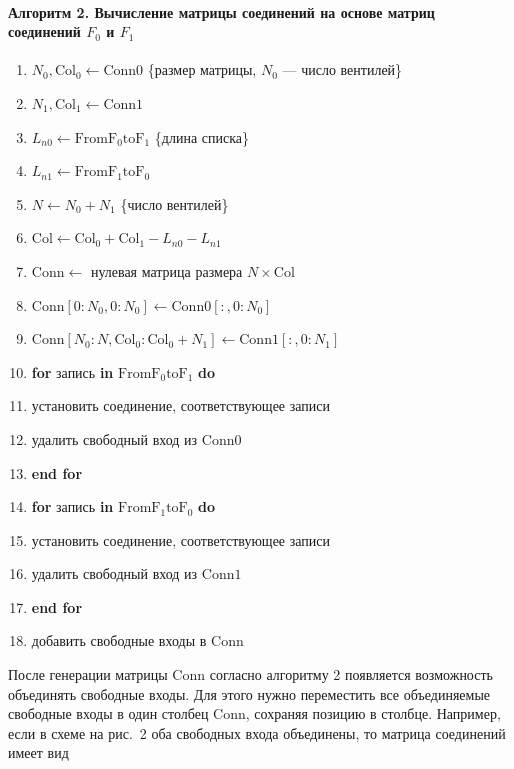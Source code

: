 \documentclass[a4paper,12pt]{article}
\begin{document}
\paragraph{Алгоритм 2. Вычисление матрицы соединений на основе матриц соединений \(F_0\) и \(F_1\)}
\begin{enumerate}
\item \(N_0, \mathrm{Col}_0 \leftarrow \mathrm{Conn0}\) \{размер матрицы, \(N_0\) --- число вентилей\}
\item \(N_1, \mathrm{Col}_1 \leftarrow \mathrm{Conn1}\)
\item \(L_{n0} \leftarrow \mathrm{FromF_0toF_1}\) \{длина списка\}
\item \(L_{n1} \leftarrow \mathrm{FromF_1toF_0}\)
\item \(N \leftarrow N_0 + N_1\) \{число вентилей\}
\item \(\mathrm{Col} \leftarrow \mathrm{Col}_0 + \mathrm{Col}_1 - L_{n0} - L_{n1}\)
\item \(\mathrm{Conn} \leftarrow\) нулевая матрица размера \(N \times \mathrm{Col}\)
\item \(\mathrm{Conn}[0:N_0, 0:N_0] \leftarrow \mathrm{Conn0}[:, 0:N_0]\)
\item \(\mathrm{Conn}[N_0:N, \mathrm{Col}_0:\mathrm{Col}_0 + N_1] \leftarrow \mathrm{Conn1}[:, 0:N_1]\)
\item \textbf{for} запись \textbf{in} \(\mathrm{FromF_0toF_1}\) \textbf{do}
\item \quad установить соединение, соответствующее записи
\item \quad удалить свободный вход из \(\mathrm{Conn0}\)
\item \textbf{end for}
\item \textbf{for} запись \textbf{in} \(\mathrm{FromF_1toF_0}\) \textbf{do}
\item \quad установить соединение, соответствующее записи
\item \quad удалить свободный вход из \(\mathrm{Conn1}\)
\item \textbf{end for}
\item добавить свободные входы в \(\mathrm{Conn}\)
\end{enumerate}

После генерации матрицы \(\mathrm{Conn}\) согласно алгоритму 2 появляется возможность объединять свободные входы. Для этого нужно переместить все объединяемые свободные входы в один столбец \(\mathrm{Conn}\), сохраняя позицию в столбце. Например, если в схеме на рис.~2 оба свободных входа объединены, то матрица соединений имеет вид
\end{document}
